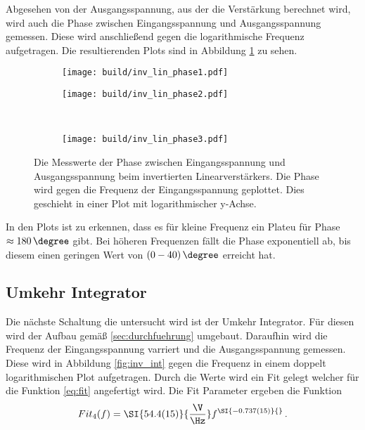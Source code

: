 Abgesehen von der Ausgangsspannung, aus der die Verstärkung berechnet wird, wird auch die Phase zwischen Eingangsspannung und Ausgangsspannung gemessen.
Diese wird anschließend gegen die logarithmische  Frequenz aufgetragen.
Die resultierenden Plots sind in Abbildung \ref{fig:phase} zu sehen.
\begin{figure}
    \centering
    \begin{subfigure}{0.49\linewidth}%
        \texttt{[image: build/inv\_lin\_phase1.pdf]}
    \end{subfigure}
    \hfill
    \begin{subfigure}{0.49\linewidth}%
        \texttt{[image: build/inv\_lin\_phase2.pdf]}
    \end{subfigure}\\
    \begin{subfigure}{0.49\linewidth}%
        \texttt{[image: build/inv\_lin\_phase3.pdf]}
    \end{subfigure}
    \caption{Die Messwerte der Phase zwischen Eingangsspannung und Ausgangsspannung beim invertierten Linearverstärkers. Die Phase wird gegen die Frequenz der Eingangsspannung geplottet.
    Dies geschieht in einer Plot mit logarithmischer y-Achse.}
    \label{fig:phase}
\end{figure}
In den Plots ist zu erkennen, dass es für kleine Frequenz ein Plateu für Phase $\approx 180\,\degree$ gibt.
Bei höheren Frequenzen fällt die Phase exponentiell ab, bis diesem einen geringen Wert von $(0-40)\,\degree$ erreicht hat.

\subsection{Umkehr Integrator}
Die nächste Schaltung die untersucht wird ist der Umkehr Integrator.
Für diesen wird der Aufbau gemäß \ref{sec:durchfuehrung} umgebaut.
Daraufhin wird die Frequenz der Eingangsspannung varriert und die Ausgangsspannung gemessen.
Diese wird in Abbildung \ref{fig:inv_int} gegen die Frequenz in einem doppelt logarithmischen Plot aufgetragen.
Durch die Werte wird ein Fit gelegt welcher für die Funktion \eqref{eq:fit} angefertigt wird.
Die Fit Parameter ergeben die Funktion
\begin{align*}
    Fit_4(f) = \SI{54.4(15)}{\frac{\V}{\Hz}} f^{\SI{-0.737(15)}{}} \, .
\end{align*}

